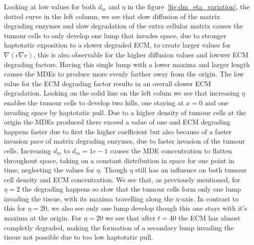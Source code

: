 Looking at low values for both $d_m$ and $\eta$ in the figure~\ref{fig:dm_eta_variation}, the dotted curve in the left column, we see that slow diffusion of the matrix degrading enzymes and slow degradation of the extra cellular matrix causes the tumour cells to only develop one lump that invades space, due to stronger haptotatic exposition to a slower degraded ECM, to create larger values for $\nabla (c \nabla e)$, this is also observable for the higher diffusion values and lowwer ECM degrading factors. Having this single lump with a lower maxima and larger length causes the MDEs to produce more evenly farther away from the origin. The low value for the ECM degrading factor results in an overall slower ECM degradation. Looking on the solid line on the left colum we see that increasing $\eta$ enables the tumour cells to develop two hills, one staying at $x=0$ and one invading space by haptotatic pull. Due to a higher density of tumour cells at the origin the MDEs produced there exceed a value of one and ECM degrading happens faster due to first the higher coefficient but also because of a faster invasion pace of matrix degrading enzymes, due to faster invasion of the tumour cells. Increasing $d_m$ to $d_m=1e-1$ causes the MDE concentration to flatten throughout space, taking on a constant distribution in space for one point in time, neglecting the values for $\eta$. Though $\eta$ still has an influence on both tumour cell density and ECM concentration. We see that, as previously mentioned, for $\eta=2$ the degrading happens so slow that the tumour cells form only one lump invading the tissue, with its maxima travelling along the x-axis. In contrast to this for $\eta=20$, we also see only one lump develop though this one stays with it's maxima at the origin. For $\eta=20$ we see that after $t=40$ the ECM has almost completly degraded, making the formation of a secondary lump invading the tissue not possible due to too low haptotatic pull. 

